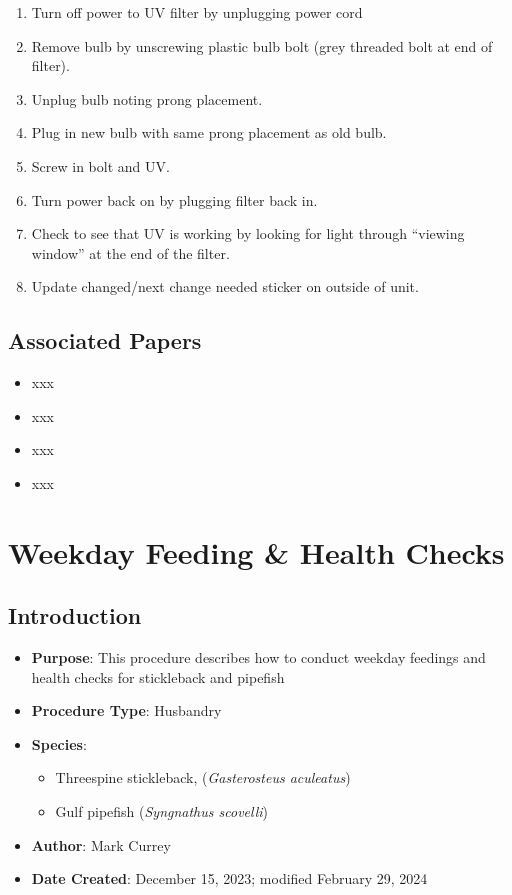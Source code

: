\documentclass[
  letterpaper,
  DIV=11,
  numbers=noendperiod]{scrreprt}
\providecommand{\tightlist}{%
  \setlength{\itemsep}{0pt}\setlength{\parskip}{0pt}}\usepackage{longtable,booktabs,array}
\begin{document}
\begin{enumerate}
\def\labelenumi{\arabic{enumi}.}
\tightlist
\item
  Turn off power to UV filter by unplugging power cord
\item
  Remove bulb by unscrewing plastic bulb bolt (grey threaded bolt at end
  of filter).
\item
  Unplug bulb noting prong placement.
\item
  Plug in new bulb with same prong placement as old bulb.
\item
  Screw in bolt and UV.
\item
  Turn power back on by plugging filter back in.
\item
  Check to see that UV is working by looking for light through ``viewing
  window'' at the end of the filter.
\item
  Update changed/next change needed sticker on outside of unit.
\end{enumerate}

\hypertarget{associated-papers-9}{%
\section{Associated Papers}\label{associated-papers-9}}

\begin{itemize}
\tightlist
\item
  xxx
\item
  xxx
\item
  xxx
\item
  xxx
\end{itemize}

\hypertarget{sec-Husb-weekday_feeding}{%
\chapter{Weekday Feeding \& Health
Checks}\label{sec-Husb-weekday_feeding}}

\hypertarget{introduction-17}{%
\section{Introduction}\label{introduction-17}}

\begin{itemize}
\tightlist
\item
  \textbf{Purpose}: This procedure describes how to conduct weekday
  feedings and health checks for stickleback and pipefish
\item
  \textbf{Procedure Type}: Husbandry
\item
  \textbf{Species}:

  \begin{itemize}
  \tightlist
  \item
    Threespine stickleback, (\emph{Gasterosteus aculeatus})
  \item
    Gulf pipefish (\emph{Syngnathus scovelli})
  \end{itemize}
\item
  \textbf{Author}: Mark Currey
\item
  \textbf{Date Created}: December 15, 2023; modified February 29, 2024
\end{itemize}
\end{document}
